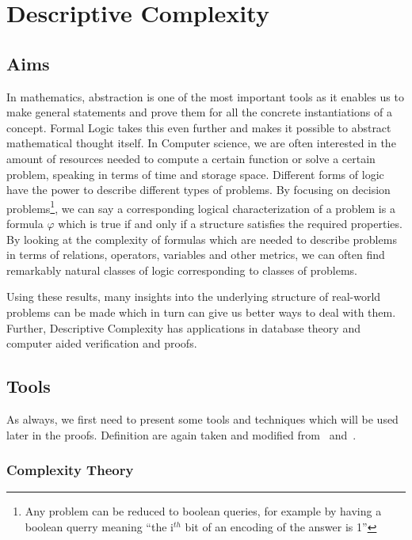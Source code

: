\chapter{Descriptive Complexity}\label{ch:descriptive-complexity}


\section{Aims}\label{sec:aims}

In mathematics, abstraction is one of the most important tools as it enables us to make general statements and prove them for all the concrete instantiations of a concept.
Formal Logic takes this even further and makes it possible to abstract mathematical thought itself.
In Computer science, we are often interested in the amount of resources needed to compute a certain function or solve a certain problem, speaking in terms of time and storage space.
Different forms of logic have the power to describe different types of problems.
By focusing on decision problems\footnote{Any problem can be reduced to boolean queries, for example by having a boolean querry meaning ``the i$^{th}$ bit of an encoding of the answer is 1''}, we can say a corresponding logical characterization of a problem is a formula $\varphi$ which is true if and only if a structure satisfies the required properties.
By looking at the complexity of formulas which are needed to describe problems in terms of relations, operators, variables and other metrics, we can often find remarkably natural classes of logic corresponding to classes of problems.

Using these results, many insights into the underlying structure of real-world problems can be made which in turn can give us better ways to deal with them.
Further, Descriptive Complexity has applications in database theory and computer aided verification and proofs.


\section{Tools}\label{sec:tools}

As always, we first need to present some tools and techniques which will be used later in the proofs.
Definition are again taken and modified from~\cite{theory-cs} and~\cite{descriptive-complexity}.

\subsection{Complexity Theory}\label{subsec:complexity-theory}

